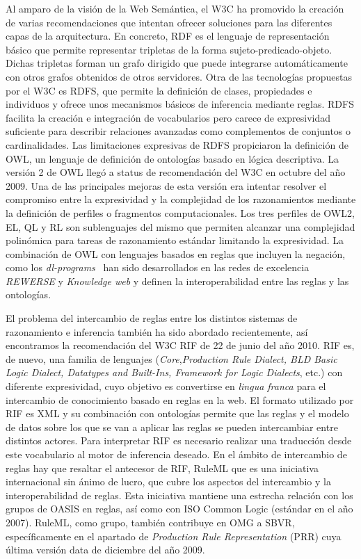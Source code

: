 Al amparo de la visión de la Web Semántica, el \gls{W3C} ha promovido la creación de varias recomendaciones que intentan ofrecer soluciones 
para las diferentes capas de la arquitectura. En concreto, RDF es el lenguaje de representación básico que 
permite representar tripletas de la forma sujeto-predicado-objeto. Dichas tripletas 
forman un grafo dirigido que puede integrarse automáticamente con otros grafos obtenidos de otros servidores. 
Otra de las tecnologías propuestas por el W3C es RDFS, que permite la definición de clases, propiedades e individuos y 
ofrece unos mecanismos básicos de inferencia mediante reglas. RDFS facilita la creación e integración de vocabularios 
pero carece de expresividad suficiente para describir relaciones avanzadas como complementos de conjuntos o cardinalidades. Las limitaciones 
expresivas de RDFS propiciaron la definición de \gls{OWL}, un lenguaje de definición de ontologías basado en lógica descriptiva. 
La versión 2 de OWL llegó a status de recomendación del W3C en octubre del año 2009. Una de las principales mejoras de esta versión era 
intentar resolver el compromiso entre la expresividad y la complejidad de los razonamientos mediante la definición de perfiles o 
fragmentos computacionales. Los tres perfiles de OWL2, EL, QL y RL son sublenguajes del mismo que permiten alcanzar una complejidad 
polinómica para tareas de razonamiento estándar limitando la expresividad. La combinación de OWL con lenguajes basados en 
reglas que incluyen la negación, como los \textit{dl-programs}~\cite{DBLP:conf/rr/Motik08} han sido desarrollados en las redes de excelencia 
\textit{REWERSE} y \textit{Knowledge web} y definen la interoperabilidad entre las reglas y las ontologías. 

El problema del intercambio de reglas entre los distintos sistemas de razonamiento e inferencia también ha sido abordado recientemente, 
así encontramos la recomendación del W3C RIF de 22 de junio del año 2010. 
\gls{RIF} es, de nuevo, una familia de lenguajes (\textit{Core},\textit{Production Rule Dialect, BLD Basic Logic Dialect, Datatypes and Built-Ins, Framework for Logic Dialects}, etc.) 
con diferente expresividad, cuyo objetivo es convertirse en \textit{lingua franca} para el intercambio de conocimiento basado en reglas en la web. 
El formato utilizado por RIF es \gls{XML} y su combinación con ontologías permite que las reglas y el modelo de datos sobre los que se van a aplicar 
las reglas se pueden intercambiar entre distintos actores. Para interpretar RIF es necesario realizar una traducción desde este vocabulario al motor de inferencia
deseado. En el ámbito de intercambio de reglas hay que resaltar el antecesor de RIF, RuleML que es una iniciativa internacional sin ánimo de lucro, que cubre
los aspectos del intercambio y la interoperabilidad de reglas. Esta iniciativa mantiene una estrecha relación con los grupos de OASIS en reglas, así como con
ISO Common Logic (estándar en el año 2007). RuleML, como grupo, también contribuye en \gls{OMG} a \gls{SBVR}, específicamente en el apartado de \textit{Production Rule Representation} (PRR) cuya última
versión data de diciembre del año 2009.

